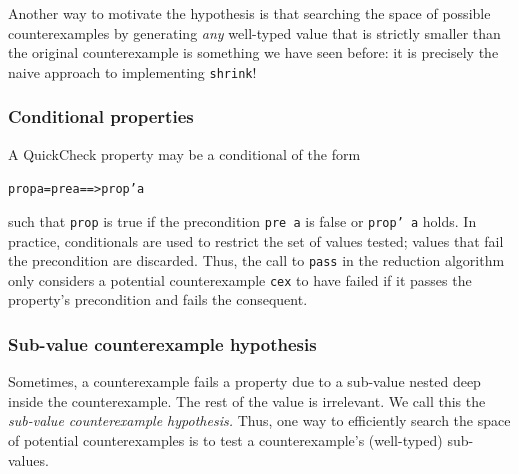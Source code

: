 \documentclass[10pt]{sigplanconf}
\newenvironment{code}{\begin{alltt}}{\end{alltt}}
\newcommand{\ttp}[1]{\texttt{#1}}
\begin{document}
Another way to motivate the hypothesis is that searching the space of possible
counterexamples by generating \emph{any} well-typed value that is strictly
smaller than the original counterexample is something we have seen before: it is
precisely the naive approach to implementing \ttp{shrink}!

\subsubsection{Conditional properties}
A QuickCheck property may be a conditional of the form
%
\begin{code}
prop a = pre a ==> prop' a
\end{code}
%
\noindent
such that \ttp{prop} is true if the precondition \ttp{pre a} is false or
\ttp{prop' a} holds.  In practice, conditionals are used to restrict the set of
values tested; values that fail the precondition are discarded.  Thus, the call
to \ttp{pass} in the reduction algorithm only considers a potential
counterexample \ttp{cex} to have failed if it passes the property's
precondition and fails the consequent.

\subsubsection{Sub-value counterexample hypothesis}\label{sec:subval}
Sometimes, a counterexample fails a property due to a sub-value nested deep
inside the counterexample.  The rest of the value is irrelevant.  We call this
the \emph{sub-value counterexample hypothesis.}  Thus, one way to efficiently
search the space of potential counterexamples is to test a counterexample's
(well-typed) sub-values.
\end{document}
